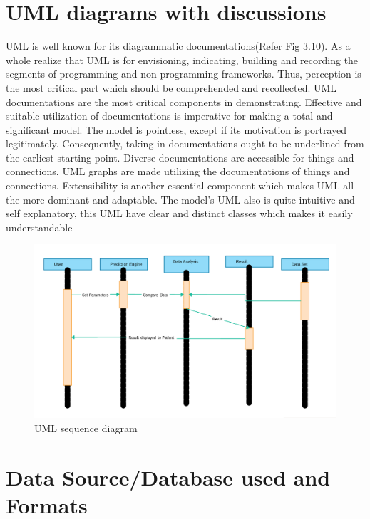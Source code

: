 \documentclass{book}
\begin{document}
	\section{UML diagrams with discussions} 
	UML is well known for its diagrammatic documentations(Refer Fig 3.10). As a whole 
	realize that UML is for envisioning, indicating, building and recording the segments 
	of programming and non-programming frameworks. Thus, perception is the most 
	critical part which should be comprehended and recollected. UML documentations 
	are the most critical components in demonstrating. Effective and suitable utilization 
	of documentations is imperative for making a total and significant model. The model 
	is pointless, except if its motivation is portrayed legitimately. Consequently, taking 
	in documentations ought to be underlined from the earliest starting point. Diverse 
	documentations are accessible for things and connections. UML graphs are made 
	utilizing the documentations of things and connections. Extensibility is another essential component which makes UML all the more dominant and adaptable. The 
	model’s UML also is quite intuitive and self explanatory, this UML have clear and 
	distinct classes which makes it easily understandable
	\begin{figure}[h]
		\begin{center}
			\includegraphics[width=15cm]{images/uml_diagram.png}
			\caption{UML sequence diagram}
		\end{center}
	\end{figure}
	
	
	
	






  	
  	\section{Data Source/Database used and Formats}
\end{document}
